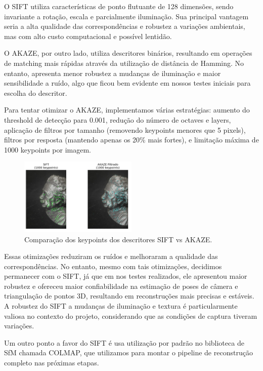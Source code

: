 \documentclass[12pt]{article}
\begin{document}
O SIFT utiliza características de ponto flutuante de 128 dimensões, sendo invariante a rotação, escala e parcialmente iluminação. Sua principal vantagem seria a alta qualidade das correspondências e robustez a variações ambientais, mas com alto custo computacional e possível lentidão.

O AKAZE, por outro lado, utiliza descritores binários, resultando em operações de matching mais rápidas através da utilização de distância de Hamming. No entanto, apresenta menor robustez a mudanças de iluminação e maior sensibilidade a ruído, algo que ficou bem evidente em nossos testes iniciais para escolha do descritor.

Para tentar otimizar o AKAZE, implementamos várias estratégias: aumento do threshold de detecção para 0.001, redução do número de octaves e layers, aplicação de filtros por tamanho (removendo keypoints menores que 5 pixels), filtros por resposta (mantendo apenas os 20\% mais fortes), e limitação máxima de 1000 keypoints por imagem.

\begin{figure}[H]
    \centering
    \includegraphics[width=0.5\textwidth]{images/akaze_sift_comparison_5.png}
    \caption{Comparação dos keypoints dos descritores SIFT vs AKAZE.}
    \label{fig:sift}
\end{figure}

Essas otimizações reduziram os ruídos e melhoraram a qualidade das correspondências.
No entanto, mesmo com tais otimizações, decidimos permanecer com o SIFT, já que em nos testes realizados, ele apresentou maior robustez e ofereceu maior confiabilidade na estimação de poses de câmera e triangulação de pontos 3D, resultando em reconstruções mais precisas e estáveis. A robustez do SIFT a mudanças de iluminação e textura é particularmente valiosa no contexto do projeto, considerando que as condições de captura tiveram variações.

Um outro ponto a favor do SIFT é usa utilização por padrão no biblioteca de SfM chamada COLMAP, que utilizamos para montar o pipeline de reconstrução completo nas próximas etapas.
\end{document}
